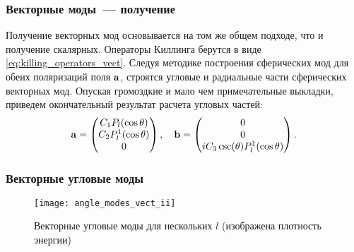 \documentclass{beamer}
\begin{document}

    \begin{frame}\frametitle{Векторные моды~--- получение}

        Получение векторных мод основывается на том же общем подходе, что и получение скалярных. Операторы Киллинга берутся в виде \autoref{eq:killing_operators_vect}. Следуя методике построения сферических мод для обеих поляризаций поля $\vb{a}$, строятся угловые и радиальные части сферических векторных мод. Опуская громоздкие и мало чем примечательные выкладки, приведем окончательный результат расчета угловых частей:
        \begin{equation}
            \vb{a} = \begin{pmatrix}
                C_1 P_l(\cos\theta) \\
                C_2 P_l^1(\cos\theta) \\
                0
            \end{pmatrix} , \quad
            \vb{b} = \begin{pmatrix}
                0 \\
                0 \\
                i C_3 \csc(\theta) P_l^1(\cos\theta)
            \end{pmatrix} .
        \end{equation}

    \end{frame}


    \begin{frame}\frametitle{Векторные угловые моды}

        \begin{figure}[h]
            \centering
            \texttt{[image: angle\_modes\_vect\_ii]}
            \caption[]{Векторные угловые моды для нескольких $l$ (изображена плотность энергии)}
            \label{fig:angle_modes_vect_ii}
        \end{figure}

    \end{frame}
\end{document}

